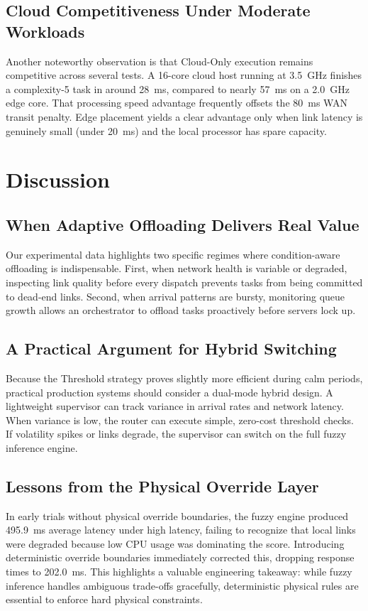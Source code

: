 \documentclass[conference]{IEEEtran}
\begin{document}
\subsection{Cloud Competitiveness Under Moderate Workloads}
Another noteworthy observation is that Cloud-Only execution remains competitive across several tests. A 16-core cloud host running at 3.5~GHz finishes a complexity-5 task in around 28~ms, compared to nearly 57~ms on a 2.0~GHz edge core. That processing speed advantage frequently offsets the 80~ms WAN transit penalty. Edge placement yields a clear advantage only when link latency is genuinely small (under 20~ms) and the local processor has spare capacity.

\section{Discussion}
\label{sec:discussion}

\subsection{When Adaptive Offloading Delivers Real Value}
Our experimental data highlights two specific regimes where condition-aware offloading is indispensable. First, when network health is variable or degraded, inspecting link quality before every dispatch prevents tasks from being committed to dead-end links. Second, when arrival patterns are bursty, monitoring queue growth allows an orchestrator to offload tasks proactively before servers lock up.

\subsection{A Practical Argument for Hybrid Switching}
Because the Threshold strategy proves slightly more efficient during calm periods, practical production systems should consider a dual-mode hybrid design. A lightweight supervisor can track variance in arrival rates and network latency. When variance is low, the router can execute simple, zero-cost threshold checks. If volatility spikes or links degrade, the supervisor can switch on the full fuzzy inference engine.

\subsection{Lessons from the Physical Override Layer}
In early trials without physical override boundaries, the fuzzy engine produced 495.9~ms average latency under high latency, failing to recognize that local links were degraded because low CPU usage was dominating the score. Introducing deterministic override boundaries immediately corrected this, dropping response times to 202.0~ms. This highlights a valuable engineering takeaway: while fuzzy inference handles ambiguous trade-offs gracefully, deterministic physical rules are essential to enforce hard physical constraints.
\end{document}
